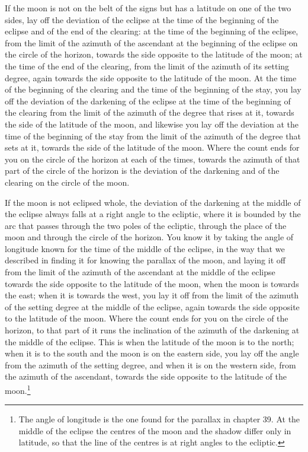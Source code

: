 \documentclass[11pt]{article}
\newcommand{\ArPage}[1]{\marginpar{\footnotesize\color{gray}Ar.\,p.\,#1}}
\begin{document}
\par If the moon is not on the belt of the signs but has a latitude on one of the two sides, lay off the deviation of the eclipse at the time of the beginning of the eclipse and of the end of the clearing: at the time of the beginning of the eclipse, from the limit of the azimuth of the ascendant at the beginning of the eclipse on the circle of the horizon, towards the side opposite to the latitude of the moon; at the time of the end of the clearing, from the limit of the azimuth of its setting degree, again towards the side opposite to the latitude of the moon. At the time of the beginning of the clearing and the time of the beginning of the stay, you lay off the deviation of the darkening of the eclipse at the time of the beginning of the clearing from the limit of the azimuth of the degree that rises at it, towards the side of the latitude of the moon, and likewise you lay off the deviation at the time of the beginning of the stay from the limit of the azimuth of the degree that sets at it, towards the side of the latitude of the moon. Where the count ends for you on the circle of the horizon at each of the times, towards the azimuth of that part of the circle of the horizon is the deviation of the darkening and of the clearing on the circle of the moon.\par
\par \ArPage{152}If the moon is not eclipsed whole, the deviation of the darkening at the middle of the eclipse always falls at a right angle to the ecliptic, where it is bounded by the arc that passes through the two poles of the ecliptic, through the place of the moon and through the circle of the horizon. You know it by taking the angle of longitude known for the time of the middle of the eclipse, in the way that we described in finding it for knowing the parallax of the moon, and laying it off from the limit of the azimuth of the ascendant at the middle of the eclipse towards the side opposite to the latitude of the moon, when the moon is towards the east; when it is towards the west, you lay it off from the limit of the azimuth of the setting degree at the middle of the eclipse, again towards the side opposite to the latitude of the moon. Where the count ends for you on the circle of the horizon, to that part of it runs the inclination of the azimuth of the darkening at the middle of the eclipse. This is when the latitude of the moon is to the north; when it is to the south and the moon is on the eastern side, you lay off the angle from the azimuth of the setting degree, and when it is on the western side, from the azimuth of the ascendant, towards the side opposite to the latitude of the moon.\footnote{The angle of longitude is the one found for the parallax in chapter 39. At the middle of the eclipse the centres of the moon and the shadow differ only in latitude, so that the line of the centres is at right angles to the ecliptic.}\par
\end{document}
